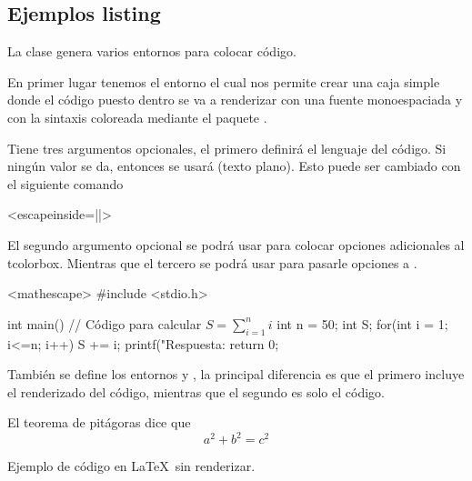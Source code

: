 \documentclass[theme=mocha, pagecolor, pagesize=a5paper, stretchmode=true]{qx-files/qx-notes}
\begin{document}
  \subsection{Ejemplos listing}

  La clase  genera varios entornos para colocar código.

  En primer lugar tenemos el entorno  el cual nos permite crear una caja simple donde el código puesto dentro se va a renderizar con una fuente monoespaciada y con la sintaxis coloreada mediante el paquete .

  Tiene tres argumentos opcionales, el primero definirá el lenguaje del código. Si ningún valor se da, entonces se usará  (texto plano). Esto puede ser cambiado con el siguiente comando
  \begin{texcode}<escapeinside=||>
  \end{texcode}
  El segundo argumento opcional se podrá usar para colocar opciones adicionales al tcolorbox. Mientras que el tercero se podrá usar para pasarle opciones a .

  \begin{texexample}
    \begin{codeblock}[c][colframe=red]<mathescape>
      #include <stdio.h>

      int main() {
        // Código para calcular $ S = \sum_{i=1}^n i$
        int n = 50;
        int S;
        for(int i = 1; i<=n; i++){
          S += i;
        }
        printf("Respuesta: %
        return 0;
      }
    \end{codeblock}
  \end{texexample}

  También se define los entornos  y , la principal diferencia es que el primero incluye el renderizado del código, mientras que el segundo es solo el código.

  \begin{codeblock}
    \begin{texexample}
      El teorema de pitágoras dice que
      \[ a^2 + b^2 = c^2 \]
    \end{texexample}
  \end{codeblock}

  \begin{texexample}
    \begin{texcode}
      Ejemplo de código en \LaTeX\ sin renderizar.
    \end{texcode}
  \end{texexample}
\end{document}
